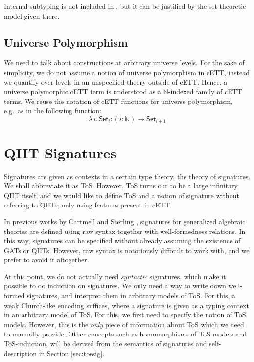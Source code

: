 \documentclass{article}
\theoremstyle{definition}
\theoremstyle{theorem}
\newcommand{\ra}{\rightarrow}
\newcommand{\Set}{\mathsf{Set}}
\begin{document}
Internal subtyping is not included in \cite{timany2018cumulative}, but it can be
justified by the set-theoretic model given there.

\subsection{Universe Polymorphism}
\label{sec:universe_polymorphism}

We need to talk about constructions at arbitrary universe levels. For the sake
of simplicity, we do not assume a notion of universe polymorphism in cETT,
instead we quantify over levels in an unspecified theory outside of cETT. Hence,
a universe polymorphic cETT term is understood as a $\mathbb{N}$-indexed family
of cETT terms. We reuse the notation of cETT functions for
universe polymorphism, e.g.\ as in the following function:
\[
\lambda\,i.\,\Set_i : (i : \mathbb{N})\ra \Set_{i+1}
\]

\section{QIIT Signatures}
\label{sec:tos}

Signatures are given as contexts in a certain type theory, the theory of
signatures. We shall abbreviate it as ToS. However, ToS turns out to be a large
infinitary QIIT itself, and we would like to define ToS and a notion of
signature without referring to QIITs, only using features present in cETT.

In previous works by Cartmell \cite{gat} and Sterling
\cite{sterling2019algebraic}, signatures for generalized algebraic theories are
defined using raw syntax together with well-formedness relations. In this way,
signatures can be specified without already assuming the existence of GATs or
QIITs. However, raw syntax is notoriously difficult to work with, and we prefer
to avoid it altogether.

At this point, we do not actually need \emph{syntactic} signatures, which make
it possible to do induction on signatures. We only need a way to write down
well-formed signatures, and interpret them in arbitrary models of ToS. For this,
a weak Church-like encoding suffices, where a signature is given as a typing
context in an arbitrary model of ToS. For this, we first need to specify the
notion of ToS models. However, this is the \emph{only} piece of information
about ToS which we need to manually provide. Other concepts such as
homomorphisms of ToS models and ToS-induction, will be derived from the
semantics of signatures and self-description in Section \ref{sec:tossig}.
\end{document}

